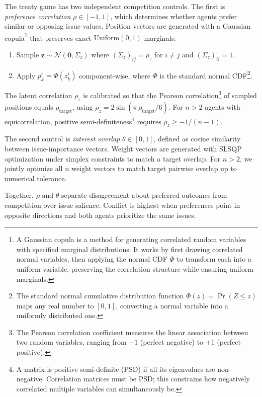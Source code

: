 The treaty game has two independent competition controls.
The first is \emph{preference correlation} $\rho \in [-1,1]$, which determines whether agents prefer similar or opposing issue values.
Position vectors are generated with a Gaussian copula\footnote{A Gaussian copula is a method for generating correlated random variables with specified marginal distributions. It works by first drawing correlated normal variables, then applying the normal CDF $\Phi$ to transform each into a uniform variable, preserving the correlation structure while ensuring uniform marginals.} that preserves exact $\text{Uniform}(0,1)$ marginals:
\begin{enumerate}
    \item Sample $\bm{z} \sim \mathcal{N}(\bm{0}, \Sigma_z)$ where $(\Sigma_z)_{ij} = \rho_z$ for $i \neq j$ and $(\Sigma_z)_{ii} = 1$.
    \item Apply $p^i_k = \Phi(z^i_k)$ component-wise, where $\Phi$ is the standard normal CDF\footnote{The standard normal cumulative distribution function $\Phi(z) = \Pr(Z \leq z)$ maps any real number to $[0,1]$, converting a normal variable into a uniformly distributed one.}.
\end{enumerate}
The latent correlation $\rho_z$ is calibrated so that the Pearson correlation\footnote{The Pearson correlation coefficient measures the linear association between two random variables, ranging from $-1$ (perfect negative) to $+1$ (perfect positive).} of sampled positions equals $\rho_{\text{target}}$, using $\rho_z = 2\sin(\pi\,\rho_{\text{target}} / 6)$.
For $n > 2$ agents with equicorrelation, positive semi-definiteness\footnote{A matrix is positive semi-definite (PSD) if all its eigenvalues are non-negative. Correlation matrices must be PSD; this constrains how negatively correlated multiple variables can simultaneously be.} requires $\rho_z \geq -1/(n-1)$.

The second control is \emph{interest overlap} $\theta \in [0,1]$, defined as cosine similarity between issue-importance vectors.
Weight vectors are generated with SLSQP optimization under simplex constraints to match a target overlap.
For $n > 2$, we jointly optimize all $n$ weight vectors to match target pairwise overlap up to numerical tolerance.

Together, $\rho$ and $\theta$ separate disagreement about preferred outcomes from competition over issue salience.
Conflict is highest when preferences point in opposite directions and both agents prioritize the same issues.

